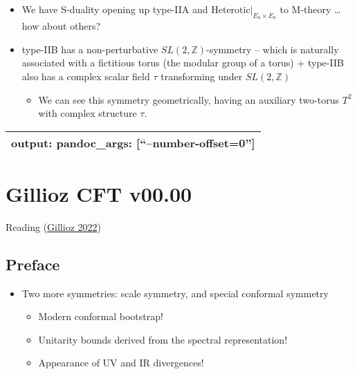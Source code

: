 \documentclass[
]{book}
\providecommand{\tightlist}{%
  \setlength{\itemsep}{0pt}\setlength{\parskip}{0pt}}
\begin{document}
\begin{itemize}
\tightlist
\item
  We have S-duality opening up type-IIA and \(\text{Heterotic}|_{E_8 \times E_8}\) to M-theory \ldots{} how about others?
\item
  type-IIB has a non-perturbative \(SL(2,\mathbb{Z})\)-symmetry -- which is naturally associated with a fictitious torus (the modular group of a torus) + type-IIB also has a complex scalar field \(\tau\) transforming under \(SL(2,\mathbb{Z})\)

  \begin{itemize}
  \tightlist
  \item
    We can see this symmetry geometrically, having an auxiliary two-torus \(T^2\) with complex structure \(\tau\).
  \end{itemize}
\end{itemize}

\begin{longtable}[]{@{}l@{}}
\toprule
\endhead
output: pandoc\_args: {[}``--number-offset=0''{]} \\
\bottomrule
\end{longtable}

\hypertarget{gillioz-cft-v00.00}{%
\chapter*{Gillioz CFT v00.00}\label{gillioz-cft-v00.00}}

Reading (\protect\hyperlink{ref-gillioz2022conformal}{Gillioz 2022})

\hypertarget{preface}{%
\section*{Preface}\label{preface}}

\begin{itemize}
\tightlist
\item
  Two more symmetries: scale symmetry, and special conformal symmetry

  \begin{itemize}
  \tightlist
  \item
    Modern conformal bootstrap!
  \item
    Unitarity bounds derived from the spectral representation!
  \item
    Appearance of UV and IR divergences!
  \end{itemize}
\end{itemize}
\end{document}
